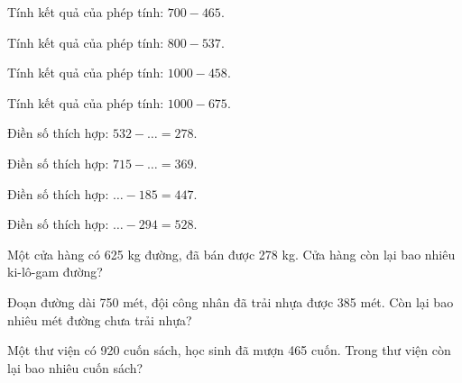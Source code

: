 \begin{ex}
Tính kết quả của phép tính: $700 - 465$.
\end{ex}

\begin{ex}
Tính kết quả của phép tính: $800 - 537$.
\end{ex}

\begin{ex}
Tính kết quả của phép tính: $1000 - 458$.
\end{ex}

\begin{ex}
Tính kết quả của phép tính: $1000 - 675$.
\end{ex}

\begin{ex}
Điền số thích hợp: $532 - \dots = 278$.
\end{ex}

\begin{ex}
Điền số thích hợp: $715 - \dots = 369$.
\end{ex}

\begin{ex}
Điền số thích hợp: $\dots - 185 = 447$.
\end{ex}

\begin{ex}
Điền số thích hợp: $\dots - 294 = 528$.
\end{ex}

\begin{ex}
Một cửa hàng có 625 kg đường, đã bán được 278 kg. Cửa hàng còn lại bao nhiêu ki-lô-gam đường?
\end{ex}

\begin{ex}
Đoạn đường dài 750 mét, đội công nhân đã trải nhựa được 385 mét. Còn lại bao nhiêu mét đường chưa trải nhựa?
\end{ex}

\begin{ex}
Một thư viện có 920 cuốn sách, học sinh đã mượn 465 cuốn. Trong thư viện còn lại bao nhiêu cuốn sách?
\end{ex}

